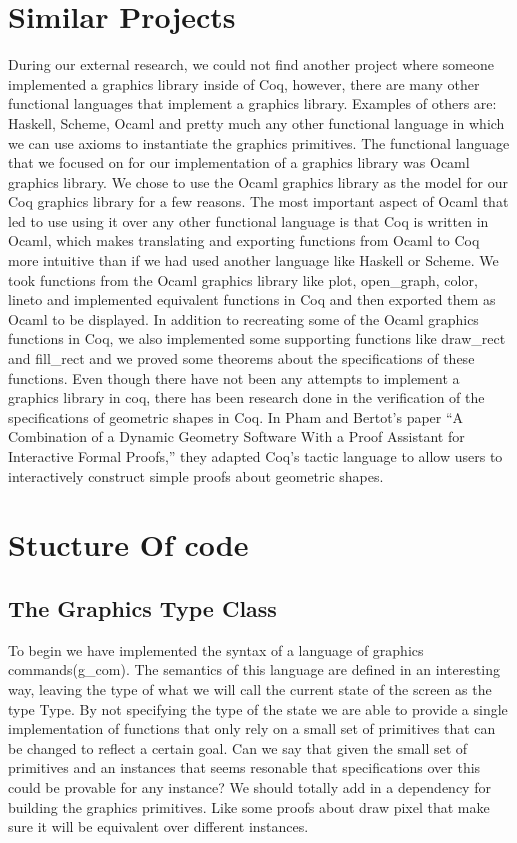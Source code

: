 \documentclass{llncs}
\begin{document}
\section{Similar Projects}
During our external research, we could not find another project where someone
implemented a graphics library inside of Coq, however, there are many other
functional languages that implement a graphics library. Examples of others
are: Haskell, Scheme, Ocaml and pretty much any other functional language in
which we can use axioms to instantiate the graphics primitives. The functional
language that we focused on for our implementation of a graphics library was
Ocaml graphics library. We chose to use the Ocaml graphics library as the
model for our Coq graphics library for a few reasons. The most important
aspect of Ocaml that led to use using it over any other functional language is
that Coq is written in Ocaml, which makes translating and exporting functions
from Ocaml to Coq more intuitive than if we had used another language like
Haskell or Scheme. We took functions from the Ocaml graphics library like plot,
open_graph, color, lineto and implemented equivalent functions in Coq and
then exported them as Ocaml to be displayed. In addition to recreating some
of the Ocaml graphics functions in Coq, we also implemented some supporting
functions like draw_rect and fill_rect and we proved some theorems about the
specifications of these functions.  Even though there have not been any attempts to implement a graphics library
in coq, there has been research done in the verification of the specifications of
geometric shapes in Coq. In Pham and Bertot’s paper “A Combination of a 
Dynamic Geometry Software With a Proof Assistant for Interactive Formal Proofs,”
\cite{geo} they adapted Coq’s tactic language to allow users to interactively
construct simple proofs about geometric shapes.



\section{Stucture Of code}

\subsection{The Graphics Type Class}
 To begin we have implemented the syntax of a language of graphics commands(g\_com). The semantics of this language are defined in an interesting way, leaving the type of what we will call the current state of the screen as the type Type.  By not specifying the type of the state we are able to
 provide a single implementation of functions that only rely on a small set of primitives that can be changed to reflect a certain goal. 
 {\color{red} Can we say that given the small set of primitives and an instances that seems resonable that specifications over this could be
   provable for any instance? We should totally add in a dependency for building the graphics primitives.  Like some proofs about draw pixel that
  make sure it will be equivalent over different instances. }
\end{document}
